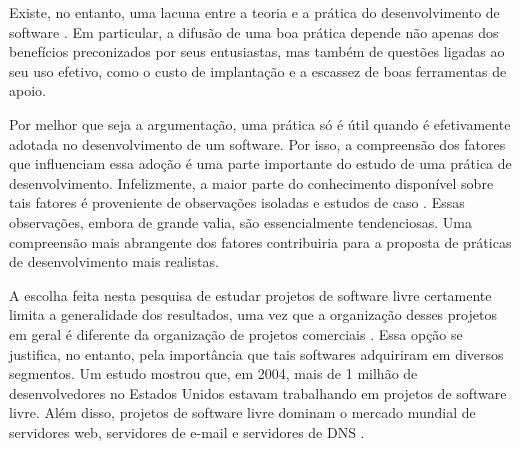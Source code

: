 \documentclass{article}
\begin{document}
Existe, no entanto, uma lacuna entre a teoria e a prática do desenvolvimento de
software \cite{glass1996}. Em particular, a difusão de uma boa prática depende
não apenas dos benefícios preconizados por seus entusiastas, mas também de
questões ligadas ao seu uso efetivo, como o custo de implantação e a escassez de
boas ferramentas de apoio. 

Por melhor que seja a argumentação, uma prática só é útil quando é efetivamente
adotada no desenvolvimento de um software. Por isso, a compreensão dos fatores
que influenciam essa adoção é uma parte importante do estudo de uma prática de
desenvolvimento. Infelizmente, a maior parte do conhecimento disponível sobre
tais fatores é proveniente de observações isoladas e estudos de caso
\cite{crowston2005}. Essas observações, embora de grande valia, são
essencialmente tendenciosas. Uma compreensão mais abrangente dos fatores
contribuiria para a proposta de práticas de desenvolvimento mais realistas.

A escolha feita nesta pesquisa de estudar projetos de software livre certamente
limita a generalidade dos resultados, uma vez que a organização desses projetos
em geral é diferente da organização de projetos comerciais \cite{raymond2001}.
Essa opção se justifica, no entanto, pela importância que tais softwares
adquiriram em diversos segmentos.  Um estudo mostrou que, em 2004, mais de 1
milhão de desenvolvedores no Estados Unidos estavam trabalhando em projetos de
software livre. Além disso, projetos de software livre dominam o mercado mundial
de servidores web, servidores de e-mail e servidores de DNS \cite{wheeler2007}.


\end{document}
